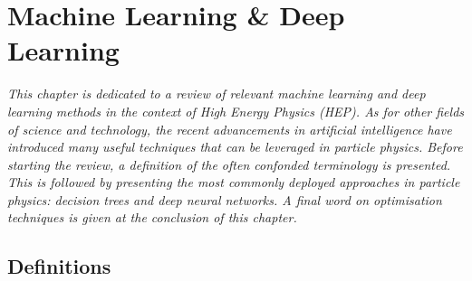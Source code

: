 \chapter{\color{oxfordblue} Machine Learning \& Deep Learning}\label{Chap-ML}
\ChapFrame

\textit{
This chapter is dedicated to a review of relevant machine learning and deep learning methods in the context of High Energy Physics (HEP). As for other fields of science and technology, the recent advancements in artificial intelligence have introduced many useful techniques that can be leveraged in particle physics. Before starting the review, a definition of the often confonded terminology is presented. This is followed by presenting the most commonly deployed approaches in particle physics: decision trees and deep neural networks. A final word on optimisation techniques is given at the conclusion of this chapter.
}

\section{Definitions}
